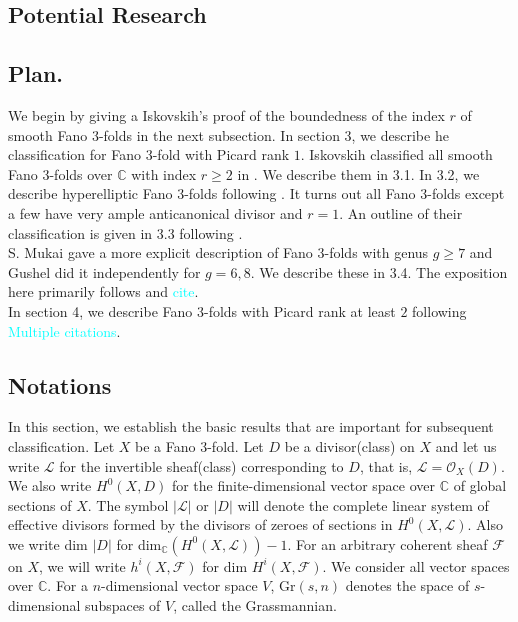 \documentclass[11pt]{amsart}
\theoremstyle{plain}
\theoremstyle{definition}
\theoremstyle{expl}
\begin{document}
\subsection{Potential Research} 

\subsection{Plan.} We begin by giving a Iskovskih's proof of the boundedness of the index $r$ of smooth Fano $3$-folds in the next subsection. In section 3, we describe he classification for Fano $3$-fold with Picard rank $1$. Iskovskih classified all smooth Fano $3$-folds over $\mathbb{C}$ with index $r\geq 2$ in \cite{Isk77}.  We describe them in 3.1. In 3.2, we describe hyperelliptic Fano $3$-folds following \cite{Isk77}. It turns out all Fano $3$-folds except a few have very ample anticanonical divisor and $r=1$. An outline of their classification is given in 3.3 following \cite{Isk78}.\\
S. Mukai gave a more explicit description of Fano $3$-folds with genus $g\geq 7$ and Gushel did it independently for $g=6,8$. We describe these in 3.4. The exposition here primarily follows \cite{Muk89} and \textcolor{cyan}{cite}.\\
In section 4, we describe Fano $3$-folds with Picard rank at least $2$ following \textcolor{cyan}{Multiple citations}. 

\subsection{Notations}
In this section, we establish the basic results that are important for subsequent classification. 
Let $X$ be a Fano $3$-fold. 
Let $D$ be a divisor(class) on $X$ and let us write $\mathcal{L}$ for the invertible sheaf(class) corresponding to $D$, that is, $\mathcal{L} = \mathcal{O}_X(D)$. We also write $H^0(X,D)$ for the finite-dimensional vector space over $\mathbb{C}$ of global sections of $X$.
The symbol $|\mathcal{L}|$ or $|D|$ will denote the complete linear system of effective divisors formed by the divisors of zeroes of sections in $H^0(X,\mathcal{L})$. Also we write dim $|D|$ for dim$_{\mathbb{C}}(H^0(X,\mathcal{L})) -1$.
For an arbitrary coherent sheaf $\mathcal{F}$ on $X$, we will write $h^i(X,\mathcal{F})$ for dim $H^i(X,\mathcal{F})$. We consider all vector spaces over $\mathbb{C}$. For a $n$-dimensional vector space $V$, Gr$(s,n)$ denotes the space of $s$-dimensional subspaces of $V$, called the Grassmannian.\\
\end{document}
